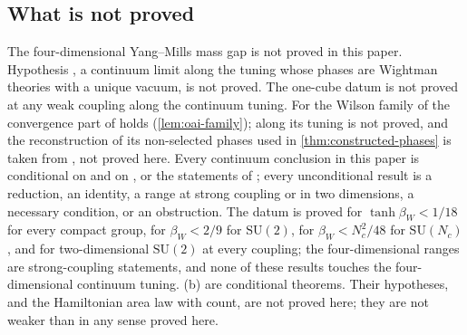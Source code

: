 \documentclass[11pt,a4paper]{amsart}
\theoremstyle{definition}
\theoremstyle{remark}
\numberwithin{equation}{section}
\newcommand{\SU}{\mathrm{SU}}              %
\newcommand{\Mcirc}{\text{\upshape(M$^{\circ}$)}}   %
\newcommand{\hypW}{\text{\upshape(W)}}              %
\newcommand{\UVB}{\text{\upshape(UVB)}}             %
\newcommand{\San}{\text{\upshape(S$'_{\mathrm{an}}$)}} %
\newcommand{\betaW}{\beta_{W}}             %
\begin{document}
\subsection*{What is not proved}
The four-dimensional Yang--Mills mass gap is not proved in this paper. Hypothesis \hypW, a continuum limit along the tuning whose phases are Wightman theories with a unique vacuum, is not proved. The one-cube datum \Mcirc{} is not proved at any weak coupling along the continuum tuning. For the Wilson family of \cite{openaiym} the convergence part of \hypW{} holds (\cref{lem:oai-family}); \Mcirc{} along its tuning is not proved, and the reconstruction of its non-selected phases used in \cref{thm:constructed-phases} is taken from \cite{ymgroup2026}, not proved here. Every continuum conclusion in this paper is conditional on \Mcirc{} and on \hypW, \UVB{} or the statements of \cite{openaiym}; every unconditional result is a reduction, an identity, a range at strong coupling or in two dimensions, a necessary condition, or an obstruction. The datum is proved for $\tanh\betaW<1/18$ for every compact group, for $\betaW<2/9$ for $\SU(2)$, for $\betaW<N_c^2/48$ for $\SU(N_c)$, and for two-dimensional $\SU(2)$ at every coupling; the four-dimensional ranges are strong-coupling statements, and none of these results touches the four-dimensional continuum tuning. (b) are conditional theorems. Their hypotheses, \San{} and the Hamiltonian area law with count, are not proved here; they are not weaker than \Mcirc{} in any sense proved here.
\end{document}
